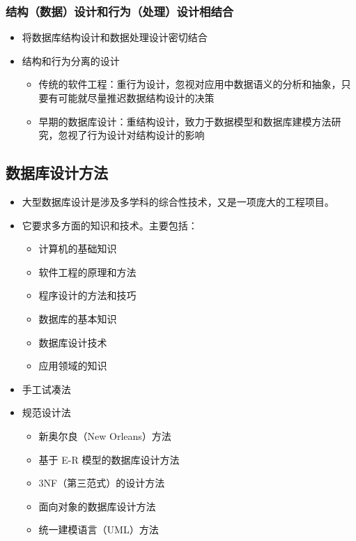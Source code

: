 \subsubsection{结构（数据）设计和行为（处理）设计相结合}
\begin{itemize}
    \item 将数据库结构设计和数据处理设计密切结合
    \item 结构和行为分离的设计
    \begin{itemize}
        \item 传统的软件工程：重行为设计，忽视对应用中数据语义的分析和抽象，只要有可能就尽量推迟数据结构设计的决策
        \item 早期的数据库设计：重结构设计，致力于数据模型和数据库建模方法研究，忽视了行为设计对结构设计的影响
    \end{itemize}
\end{itemize}

\subsection{数据库设计方法}
\begin{itemize}
    \item 大型数据库设计是涉及多学科的综合性技术，又是一项庞大的工程项目。
    \item 它要求多方面的知识和技术。主要包括：
    \vspace{-0.8em}
	\begin{multicols}{3}
        \begin{itemize}
            \item 计算机的基础知识
            \item 软件工程的原理和方法
            \item 程序设计的方法和技巧
            \item 数据库的基本知识
            \item 数据库设计技术
            \item 应用领域的知识
        \end{itemize}
	\end{multicols}
	\vspace{-1em}
    \item 手工试凑法
    \item 规范设计法
    \vspace{-0.8em}
	\begin{multicols}{2}
        \begin{itemize}
            \item 新奥尔良（New Orleans）方法
            \item 基于 E-R 模型的数据库设计方法
            \item 3NF（第三范式）的设计方法
            \item 面向对象的数据库设计方法
            \item 统一建模语言（UML）方法
        \end{itemize}
	\end{multicols}
	\vspace{-1em}
\end{itemize}

